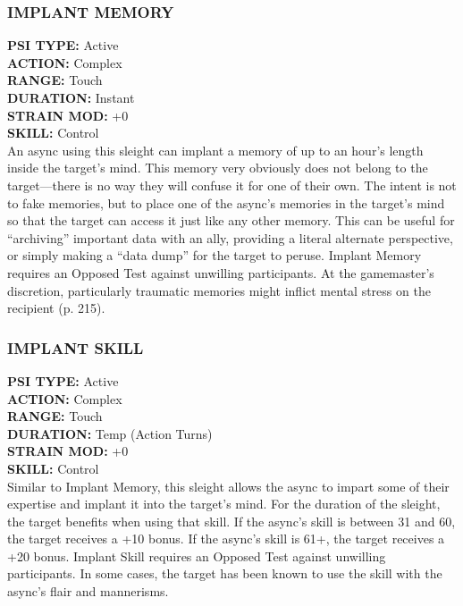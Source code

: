 \subsubsection{IMPLANT MEMORY}
\textbf{PSI TYPE:} Active \\ 
\textbf{ACTION:} Complex \\ 
\textbf{RANGE:} Touch \\ 
\textbf{DURATION:} Instant \\
\textbf{STRAIN MOD:} +0 \\ 
\textbf{SKILL:} Control\\
An async using this sleight can implant a memory
of up to an hour’s length inside the target’s mind.
This memory very obviously does not belong to the
target—there is no way they will confuse it for one
of their own. The intent is not to fake memories, but
to place one of the async’s memories in the target’s
mind so that the target can access it just like any other
memory. This can be useful for “archiving” important
data with an ally, providing a literal alternate perspective,
or simply making a “data dump” for the target
to peruse. Implant Memory requires an Opposed Test
against unwilling participants. At the gamemaster’s
discretion, particularly traumatic memories might
inflict mental stress on the recipient (p. 215).

\subsubsection{IMPLANT SKILL}
\textbf{PSI TYPE:} Active \\ 
\textbf{ACTION:} Complex \\ 
\textbf{RANGE:} Touch \\ 
\textbf{DURATION:} Temp (Action Turns) \\
\textbf{STRAIN MOD:} +0 \\ 
\textbf{SKILL:} Control\\
Similar to Implant Memory, this sleight allows the
async to impart some of their expertise and implant it
into the target’s mind. For the duration of the sleight,
the target benefits when using that skill. If the async’s
skill is between 31 and 60, the target receives a +10
bonus. If the async’s skill is 61+, the target receives
a +20 bonus. Implant Skill requires an Opposed Test
against unwilling participants. In some cases, the
target has been known to use the skill with the async’s
flair and mannerisms.

